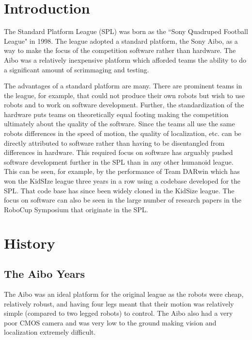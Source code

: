 \documentclass{llncs}
\begin{document}
\section{Introduction}

The Standard Platform League (SPL) was born as the ``Sony Quadruped Football League" in 1998.
The league adopted a standard platform, the Sony Aibo, as a way to make the focus
of the competition software rather than hardware. The Aibo was a relatively
inexpensive platform which afforded teams the ability to do a significant amount of scrimmaging
and testing. 

The advantages of a standard platform are many. There are prominent teams
in the league, for example, that could not produce their own robots but wish to use
robots and to work on software development. Further, the
standardization of the hardware puts teams on theoretically equal footing making the
competition ultimately about the quality of the software. Since the teams all use the
same robots differences in the speed of motion, the quality of localization, etc. can
be directly attributed to software rather than having to be disentangled from differences
in hardware.
This required focus on software
has arguably pushed software development further in the SPL than in any other humanoid
league. This can be seen, for example, by the performance of Team DARwin which has won the KidSIze
league three years in a row using a codebase developed for the SPL. That code base
has since been widely cloned in the KidSize league. The focus on software can also be
seen in the large number of research papers in the RoboCup Symposium that originate in the
SPL.

\section{History}

\subsection{The Aibo Years}

The Aibo was
an ideal platform for the original league as the robots were cheap, relatively robust,
and having four legs meant that their motion was relatively simple (compared
to two legged robots) to control. The Aibo also had a very poor CMOS camera
and was very low to the ground making vision and localization extremely
difficult. 
\end{document}
